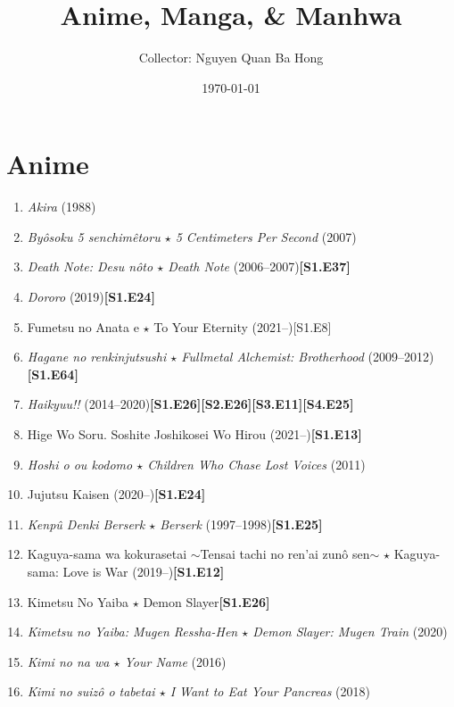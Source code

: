 \documentclass{article}
\title{Anime, Manga, {\large\&} Manhwa}
\author{Collector: Nguyen Quan Ba Hong}
\date{\today}
\numberwithin{equation}{section}
\begin{document}
\maketitle
\setcounter{secnumdepth}{6}
\setcounter{tocdepth}{6}
\tableofcontents


\section{Anime}
\begin{enumerate}
    \item \textit{Akira} (1988)
    \item \textit{Byôsoku 5 senchimêtoru $\star$ 5 Centimeters Per Second} (2007)
    \item \textit{Death Note: Desu nôto $\star$ Death Note} (2006--2007)\hfill\textbf{[S1.E37]}
    \item \textit{Dororo} (2019)\hfill\textbf{[S1.E24]}
    \item Fumetsu no Anata e $\star$ To Your Eternity (2021--)\hfill[S1.E8]
    \item \textit{Hagane no renkinjutsushi $\star$ Fullmetal Alchemist: Brotherhood} (2009--2012)\hfill\textbf{[S1.E64]}
    \item \textit{Haikyuu!!} (2014--2020)\hfill\textbf{[S1.E26][S2.E26][S3.E11][S4.E25]}
    \item Hige Wo Soru. Soshite Joshikosei Wo Hirou (2021--)\hfill\textbf{[S1.E13]}
    \item \textit{Hoshi o ou kodomo $\star$ Children Who Chase Lost Voices} (2011)
    \item Jujutsu Kaisen (2020--)\hfill\textbf{[S1.E24]}
    \item \textit{Kenp\^u Denki Berserk $\star$ Berserk} (1997--1998)\hfill\textbf{[S1.E25]}
    \item Kaguya-sama wa kokurasetai $\sim$Tensai tachi no ren'ai zun\^o sen$\sim$ $\star$ Kaguya-sama: Love is War (2019--)\hfill\textbf{[S1.E12]}
    \item Kimetsu No Yaiba $\star$ Demon Slayer\hfill\textbf{[S1.E26]}
    \item \textit{Kimetsu no Yaiba: Mugen Ressha-Hen $\star$ Demon Slayer: Mugen Train} (2020)
    \item \textit{Kimi no na wa $\star$ Your Name} (2016)
    \item \textit{Kimi no suizô o tabetai $\star$ I Want to Eat Your Pancreas} (2018)

\end{enumerate}
\end{document}
